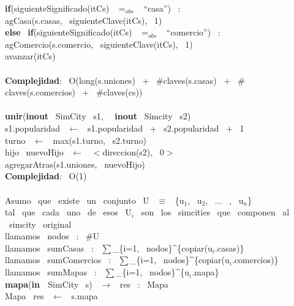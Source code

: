 \indent \indent \textbf{if}(siguienteSignificado(itCs) \ $=_{obs}$ \ ``casa'') \ :\\
\indent \indent \indent agCasa(s.casas, \ siguienteClave(itCs), \ 1)\\
\indent \indent \textbf{else} \ \textbf{if}(siguienteSignificado(itCs) \ $=_{obs}$ \ ``comercio'') \ :\\
\indent \indent \indent agComercio(s.comercio, \ siguienteClave(itCs), \ 1)\\
\indent \indent avanzar(itCs)\\
\\
\textbf{Complejidad}: \ O(long(s.uniones) \ + \ $ \# $claves(s.casas) \ + \ $ \# $claves(s.comercios) \ + \ $ \# $claves(cs))\\
\noindent\makebox[\linewidth]{\rule{\textwidth}{0.4pt}}
\\
\noindent\makebox[\linewidth]{\rule{\textwidth}{0.4pt}}
\textbf{unir}(\textbf{inout} \ SimCity \ s1, \  \ \textbf{inout} \ Simcity \ s2)\\
\indent s1.popularidad \ $\leftarrow$ \ s1.popularidad \ + \ s2.popularidad \ + \ 1\\
\indent turno \ $\leftarrow$ \ max(s1.turno, \ s2.turno)\\
\indent hijo \ nuevoHijo \ $\leftarrow$ \ $<$direccion(s2), \ 0$>$\\
\indent agregarAtras(s1.uniones, \ nuevoHijo)\\
\textbf{Complejidad}: \ O(1)\\
\noindent\makebox[\linewidth]{\rule{\textwidth}{0.4pt}}
\\
Asumo \ que \ existe \ un \ conjunto \ U \ $\equiv$ \ \{u$_1$, \ u$_2$, \ ... \ , \ u$_n$\}\\
tal \ que \ cada \ uno \ de \ esos \ U$_i$ \ son \ los \ simcities \ que \ componen \ al \ simcity \ original\\
llamamos \ nodos \ : \ $ \# $U\\
llamamos \ sumCasas \ : \ $\sum$\_\{i=1, \ nodos\}\^{}\{copiar(u$_i$.casas)\}\\
llamamos \ sumComercios \ : \ $\sum$\_\{i=1, \ nodos\}\^{}\{copiar(u$_i$.comercios)\}\\
llamamos \ sumMapas \ : \ $\sum$\_\{i=1, \ nodos\}\^{}\{u$_i$.mapa\}\\
\noindent\makebox[\linewidth]{\rule{\textwidth}{0.4pt}}
\textbf{mapa}(\textbf{in \ }SimCity \ s) \ $\rightarrow $ \ res \ : \ Mapa \ \\
\indent Mapa \ res \ $\leftarrow$ \ s.mapa\\
